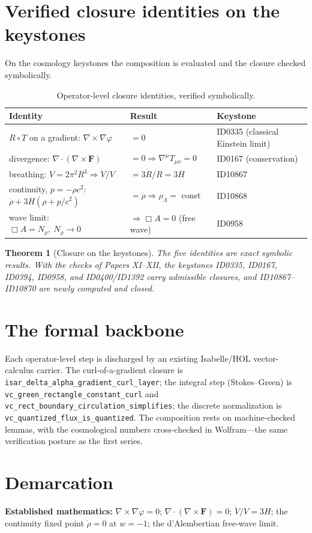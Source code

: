\documentclass[11pt]{article}
\newtheorem{theorem}{Theorem}[section]
\theoremstyle{remark}
\begin{document}
\section{Verified closure identities on the keystones}
On the cosmology keystones the composition is evaluated and the closure checked symbolically.
\begin{table}[ht]\centering
\caption{Operator-level closure identities, verified symbolically.}
\label{tab:closures}
\begin{tabular}{lll}
\toprule
Identity & Result & Keystone \\
\midrule
$R \circ T$ on a gradient: $\nabla\times\nabla\varphi$ & $= 0$ & ID0335 (classical Einstein limit) \\
divergence: $\nabla\cdot(\nabla\times\mathbf{F})$ & $= 0 \Rightarrow \nabla^\mu T_{\mu\nu} = 0$ & ID0167 (conservation) \\
breathing: $V = 2\pi^2 R^3 \Rightarrow \dot V/V$ & $= 3\dot R/R = 3H$ & ID10867 \\
continuity, $p = -\rho c^2$: $\dot\rho + 3H(\rho + p/c^2)$ & $= \dot\rho \Rightarrow \rho_\Lambda = $ const & ID10868 \\
wave limit: $\Box A = N_\rho,\ N_\rho \to 0$ & $\Rightarrow \Box A = 0$ (free wave) & ID0958 \\
\bottomrule
\end{tabular}
\end{table}
\begin{theorem}[Closure on the keystones]
The five identities are exact symbolic results. With the checks of Papers XI--XII, the keystones ID0335, ID0167, ID0394, ID0958, and ID0400/ID1392 carry admissible closures, and ID10867--ID10870 are newly computed and closed.
\end{theorem}
\section{The formal backbone}
Each operator-level step is discharged by an existing Isabelle/HOL vector-calculus carrier. The curl-of-a-gradient closure is \texttt{isar\_delta\_alpha\_gradient\_curl\_layer}; the integral step (Stokes--Green) is \texttt{vc\_green\_rectangle\_constant\_curl} and \texttt{vc\_rect\_boundary\_circulation\_simplifies}; the discrete normalization is \texttt{vc\_quantized\_flux\_is\_quantized}. The composition rests on machine-checked lemmas, with the cosmological numbers cross-checked in Wolfram---the same verification posture as the first series.
\section{Demarcation}
\textbf{Established mathematics:} $\nabla\times\nabla\varphi = 0$; $\nabla\cdot(\nabla\times\mathbf{F}) = 0$; $\dot V/V = 3H$; the continuity fixed point $\dot\rho = 0$ at $w = -1$; the d'Alembertian free-wave limit.
\end{document}
